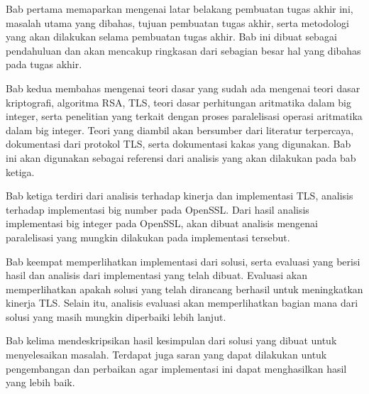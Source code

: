   Bab pertama memaparkan mengenai latar belakang pembuatan tugas akhir ini, masalah utama yang dibahas, tujuan pembuatan tugas akhir, serta metodologi yang akan dilakukan selama pembuatan tugas akhir. Bab ini dibuat sebagai pendahuluan dan akan mencakup ringkasan dari sebagian besar hal yang dibahas pada tugas akhir.

  Bab kedua membahas mengenai teori dasar yang sudah ada mengenai teori dasar kriptografi, algoritma RSA, TLS, teori dasar perhitungan aritmatika dalam big integer, serta penelitian yang terkait dengan proses paralelisasi operasi aritmatika dalam big integer. Teori yang diambil akan bersumber dari literatur terpercaya, dokumentasi dari protokol TLS, serta dokumentasi kakas yang digunakan. Bab ini akan digunakan sebagai referensi dari analisis yang akan dilakukan pada bab ketiga.

  Bab ketiga terdiri dari analisis terhadap kinerja dan implementasi TLS, analisis terhadap implementasi big number pada OpenSSL. Dari hasil analisis implementasi big integer pada OpenSSL, akan dibuat analisis mengenai paralelisasi yang mungkin dilakukan pada implementasi tersebut.

  Bab keempat memperlihatkan implementasi dari solusi, serta evaluasi yang berisi hasil dan analisis dari implementasi yang telah dibuat. Evaluasi akan memperlihatkan apakah solusi yang telah dirancang berhasil untuk meningkatkan kinerja TLS. Selain itu, analisis evaluasi akan memperlihatkan bagian mana dari solusi yang masih mungkin diperbaiki lebih lanjut.

  Bab kelima mendeskripsikan hasil kesimpulan dari solusi yang dibuat untuk menyelesaikan masalah. Terdapat juga saran yang dapat dilakukan untuk pengembangan dan perbaikan agar implementasi ini dapat menghasilkan hasil yang lebih baik.
